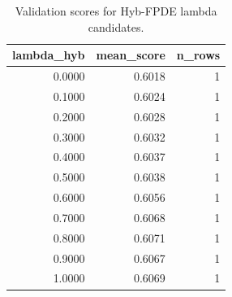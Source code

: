\begin{table}[t]
\caption{Validation scores for Hyb-FPDE lambda candidates.}
\label{tab:lambda_distribution_computed}
\centering
\begin{tabular}{rrr}
\toprule
lambda\_hyb & mean\_score & n\_rows \\
\midrule
0.0000 & 0.6018 & 1 \\
0.1000 & 0.6024 & 1 \\
0.2000 & 0.6028 & 1 \\
0.3000 & 0.6032 & 1 \\
0.4000 & 0.6037 & 1 \\
0.5000 & 0.6038 & 1 \\
0.6000 & 0.6056 & 1 \\
0.7000 & 0.6068 & 1 \\
0.8000 & 0.6071 & 1 \\
0.9000 & 0.6067 & 1 \\
1.0000 & 0.6069 & 1 \\
\bottomrule
\end{tabular}

\end{table}
